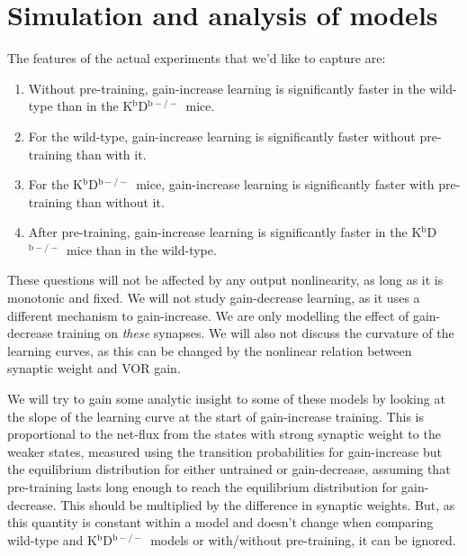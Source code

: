 \documentclass[10pt]{article}
\newcommand{\KO}{K$^\mathrm{b}$D$^{\mathrm{b}-/-}$}
\begin{document}
\section{Simulation and analysis of models}\label{sec:results}

The features of the actual experiments that we'd like to capture are:
\begin{enumerate}
  \item Without pre-training, gain-increase learning is significantly faster in the wild-type than in the \KO\ mice.
  \item For the wild-type, gain-increase learning is significantly faster without pre-training than with it.
  \item For the \KO\ mice, gain-increase learning is significantly faster with pre-training than without it.
  \item After pre-training, gain-increase learning is significantly faster in the \KO\ mice than in the wild-type.
\end{enumerate}
These questions will not be affected by any output nonlinearity, as long as it is monotonic and fixed.
We will not study gain-decrease learning, as it uses a different mechanism to gain-increase.
We are only modelling the effect of gain-decrease training on \emph{these} synapses.
We will also not discuss the curvature of the learning curves, as this can be changed by the nonlinear relation between synaptic weight and VOR gain.

We will try to gain some analytic insight to some of these models by looking at the slope of the learning curve at the start of gain-increase training.
This is proportional to the net-flux from the states with strong synaptic weight to the weaker states, measured using the transition probabilities for gain-increase but the equilibrium distribution for either untrained or gain-decrease, assuming that pre-training lasts long enough to reach the equilibrium distribution for gain-decrease.
This should be multiplied by the difference in synaptic weights.
But, as this quantity is constant within a model and doesn't change when comparing wild-type and \KO\ models or with/without pre-training, it can be ignored.
\end{document}
